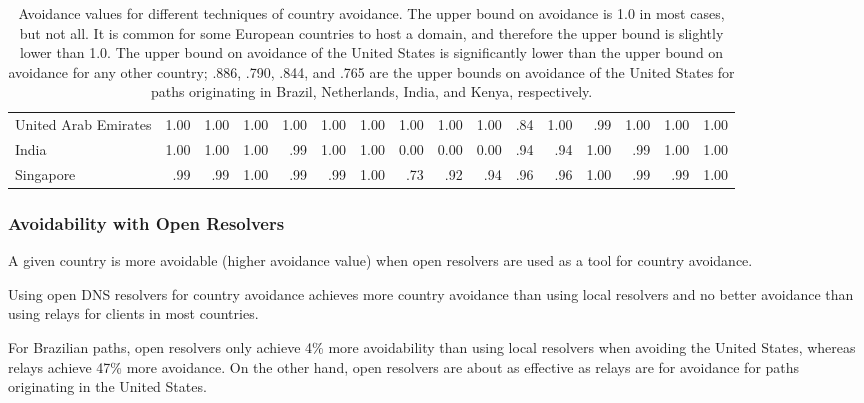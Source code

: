 \begin{table*}[h]
{\begin{tabular}{P{32mm}|d{3.2}d{3.2}d{3.2}|d{3.2}d{3.2}d{3.2}|d{3.2}d{3.2}d{3.2}|d{3.2}d{3.2}d{3.2}|d{3.2}d{3.2}d{3.2}}
United Arab Emirates &1.00  &1.00   &1.00     &1.00 &1.00 &1.00   &1.00 &1.00   &1.00  &.84 &1.00  &.99  &1.00 &1.00 &1.00  \\
India                &1.00  &1.00   &1.00     &.99 &1.00 &1.00   &0.00 &0.00   &0.00  &.94 &.94  &1.00  &.99 &1.00 &1.00  \\
Singapore            &.99  &.99   &1.00     &.99 &.99 &1.00   &.73  &.92  &.94  &.96 &.96  &1.00  &.99 &.99 &1.00  \\\midrule
\end{tabular}
}
\caption{Avoidance values for different techniques of country avoidance.  The upper bound on avoidance is 1.0 in most cases, but not all.  It is 
common for some European countries to host a domain, and therefore the upper bound is slightly lower than 1.0.  The upper bound on avoidance of the 
United States is significantly lower than the upper bound on avoidance for any other country; .886, .790, .844, and .765 are the upper bounds on avoidance 
of the United States for paths originating in Brazil, Netherlands, India, and Kenya, respectively.}
\label{tab:avoid}
\end{table*}

\subsubsection{Avoidability with Open Resolvers}

A given country is more avoidable (higher avoidance value) when open
resolvers are used as a tool for country avoidance. 

\begin{finding}
Using open DNS resolvers for country avoidance achieves more country
avoidance than using local resolvers and no better
avoidance than using relays for clients in most
countries. 
\end{finding}
\noindent
For Brazilian paths, open resolvers only achieve 4\% more avoidability than
using local resolvers when avoiding the United States, whereas relays
achieve 47\% more avoidance.  On the other hand, open resolvers are
about as effective as relays are for avoidance for paths originating in
the United States.   

